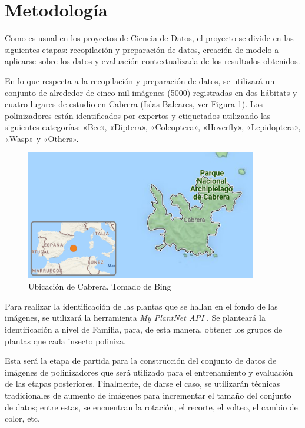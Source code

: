 \section{Metodología}

Como es usual en los proyectos de Ciencia de Datos, el proyecto se divide en las siguientes etapas: recopilación y preparación de datos, creación de modelo a aplicarse sobre los datos y evaluación contextualizada de los resultados obtenidos.

En lo que respecta a la recopilación y preparación de datos, se utilizará un conjunto de alrededor de cinco mil imágenes (5000) registradas en dos hábitats y cuatro lugares de estudio en Cabrera (Islas Baleares, ver Figura \ref{fig:ubicacion}). Los polinizadores están identificados por expertos y etiquetados utilizando las siguientes categorías: «Bee», «Diptera», «Coleoptera», «Hoverfly», «Lepidoptera», «Wasp» y «Others». 

\begin{figure}[H]
    \centering
    \includegraphics[width=0.9\textwidth]{Figuras/ubicacion.png}
    \caption[Ubicación de Cabrera.]{Ubicación de Cabrera. Tomado de Bing \cite{bing_maps}}
    \label{fig:ubicacion}
\end{figure}

Para realizar la identificación de las plantas que se hallan en el fondo de las imágenes, se utilizará la herramienta \textit{My PlantNet API} \cite{PlantNet}. Se planteará la identificación a nivel de Familia, para, de esta manera, obtener los grupos de plantas que cada insecto poliniza.

Esta será la etapa de partida para la construcción del conjunto de datos de imágenes de polinizadores que será utilizado para el entrenamiento y evaluación de las etapas posteriores. Finalmente, de darse el caso, se utilizarán técnicas tradicionales de aumento de imágenes para incrementar el tamaño del conjunto de datos; entre estas, se encuentran la rotación, el recorte, el volteo, el cambio de color, etc.


